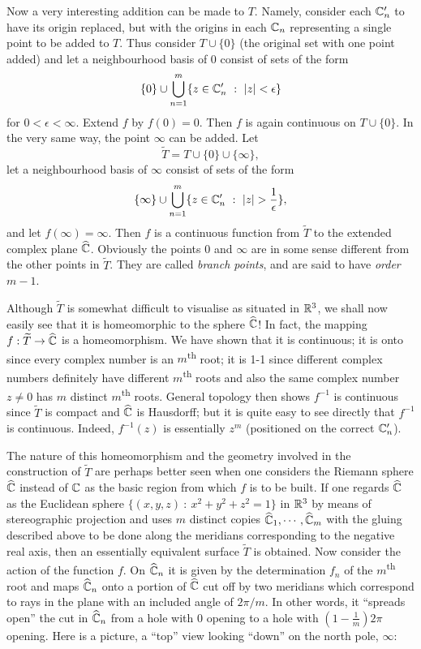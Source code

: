 \documentclass[a4paper,11pt]{article}
\begin{document}
Now a very interesting addition can be made to $T$.  Namely, consider
each ${\mathbb C}_n'$ to have its origin replaced, but with the origins in
each ${\mathbb C}_n$ representing a single point to be added to $T$.  Thus
consider $T\cup \{0\}$ (the original set with one point added) and let
a neighbourhood basis of 0 consist of sets of the form
$$
\{0\} \cup \bigcup_{n=1}^m \{z\in {\mathbb C}_n' ~:~ |z| < \epsilon\}
$$
for $0 < \epsilon < \infty$.  Extend $f$ by $f(0) = 0$.  Then $f$ is
again continuous on $T\cup \{0\}$.  In the very same way, the point
$\infty$ can be added.  Let
$$
\widetilde{T} = T \cup \{0\} \cup \{\infty\},
$$
let a neighbourhood basis of $\infty$ consist of sets of the form
$$
\{\infty\} \cup \bigcup_{n=1}^m \{z \in \CCC_n' ~:~
|z|>\frac{1}{\epsilon}\},
$$
and let $f(\infty) = \infty$.  Then $f$ is a continuous function from
$\widetilde{T}$ to the extended complex plane $\widehat{{\mathbb C}}$.
Obviously the points 0 and $\infty$ are in some sense different from
the other points in $\widetilde{T}$.  They are called \emph{branch
  points}, and are said to have \emph{order} $m-1$.

Although $\widetilde{T}$ is somewhat difficult to visualise as
situated in ${\mathbb R}^3$, we shall now easily see that it is homeomorphic
to the sphere $\widehat{{\mathbb C}}$!  In fact, the mapping $f :
\widetilde{T} \to \widehat{{\mathbb C}}$ is a homeomorphism.  We have shown
that it is continuous; it is onto since every complex number is an 
$m$\textsuperscript{th} root;  it is 1-1 since different complex
numbers definitely have different $m$\textsuperscript{th} roots and
also the same complex number $z \ne 0$ has $m$ distinct
$m$\textsuperscript{th} roots.  General topology then shows $f^{-1}$
is continuous since $\widetilde{T}$ is compact and $\widehat{{\mathbb C}}$ is
Hausdorff; but it is quite easy to see directly that $f^{-1}$ is
continuous.  Indeed, $f^{-1}(z)$ is essentially $z^m$ (positioned on
the correct ${\mathbb C}_n'$).

The nature of this homeomorphism and the geometry involved in the
construction of $\widetilde{T}$ are perhaps better seen when one
considers the Riemann sphere $\widehat{{\mathbb C}}$ instead of ${\mathbb C}$ as the
basic region from which $f$ is to be built.  If one regards
$\widehat{{\mathbb C}}$ as the Euclidean sphere $\{(x,y,z) ~:~ x^2+y^2+z^2 =
1\}$ in ${\mathbb R}^3$ by means of stereographic projection and uses $m$
distinct copies $\widehat{{\mathbb C}}_1, \cdots, \widehat{{\mathbb C}}_m$ with the
gluing described above to be done along the meridians corresponding to
the negative real axis, then an essentially equivalent surface
$\widetilde{T}$ is obtained.  Now consider the action of the function
$f$.  On $\widehat{{\mathbb C}}_n$ it is given by the determination $f_n$ of
the $m$\textsuperscript{th} root and maps $\widehat{{\mathbb C}}_n$ onto a
portion of $\widehat{{\mathbb C}}$ cut off by two meridians which correspond
to rays in the plane with an included angle of $2\pi/m$.  In other
words, it ``spreads open'' the cut in $\widehat{{\mathbb C}}_n$ from a hole
with 0 opening to a hole with $(1-\frac{1}{m})2\pi$ opening.  Here is
a picture, a ``top'' view looking ``down'' on the north pole,
$\infty$:
\end{document}
